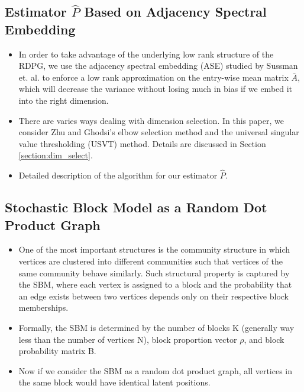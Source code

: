 \documentclass[a4paper]{article}
\begin{document}
\subsection{Estimator $\hat{P}$ Based on Adjacency Spectral Embedding}
\begin{itemize}
\item In order to take advantage of the underlying low rank structure of the RDPG, we use the adjacency spectral embedding (ASE) studied by Sussman et. al. to enforce a low rank approximation on the entry-wise mean matrix $\bar{A}$, which will decrease the variance without losing much in bias if we embed it into the right dimension.
\item There are varies ways dealing with dimension selection. In this paper, we consider Zhu and Ghodsi's elbow selection method and the universal singular value thresholding (USVT) method. Details are discussed in Section \ref{section:dim_select}.
\item Detailed description of the algorithm for our estimator $\hat{P}$.
\end{itemize}

\subsection{Stochastic Block Model as a Random Dot Product Graph}
\begin{itemize}
\item One of the most important structures is the community structure in which vertices are clustered into different communities such that vertices of the same community behave similarly. Such structural property is captured by the SBM, where each vertex is assigned to a block and the probability that an edge exists between two vertices depends only on their respective block memberships.
\item Formally, the SBM is determined by the number of blocks K (generally way less than the number of vertices N), block proportion vector $\rho$, and block probability matrix B.
\item Now if we consider the SBM as a random dot product graph, all vertices in the same block would have identical latent positions.
\end{itemize}
\end{document}
